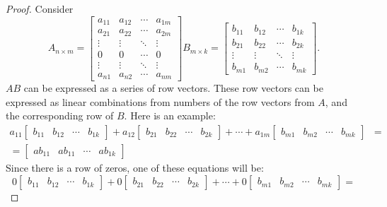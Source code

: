 \documentclass{article}
\begin{document}
\begin{enumerate}
{\begin{enumerate}
\begin{proof}
        Consider
        \[
          A_{n \times m} = \begin{bmatrix}
            a_{11} & a_{12} & \cdots & a_{1m} \\
            a_{21} & a_{22} & \cdots & a_{2m} \\
            \vdots & \vdots & \ddots & \vdots \\
            0      & 0      & \cdots & 0      \\
            \vdots & \vdots & \ddots & \vdots \\
            a_{n1} & a_{n2} & \cdots & a_{nm}
          \end{bmatrix}
          B_{m \times k} = \begin{bmatrix}
            b_{11} & b_{12} & \cdots & b_{1k} \\
            b_{21} & b_{22} & \cdots & b_{2k} \\
            \vdots & \vdots & \ddots & \vdots \\
            b_{m1} & b_{m2} & \cdots & b_{mk}
          \end{bmatrix}.
        \]
        $AB$ can be expressed as a series of row vectors. These row vectors can be expressed as linear combinations from numbers of the row vectors from $A$, and the corresponding row of $B$. Here is an example:
        \begin{align}
          a_{11}\begin{bmatrix} b_{11} & b_{12} & \cdots & b_{1k}\end{bmatrix} +
          a_{12}\begin{bmatrix} b_{21} & b_{22} & \cdots & b_{2k}\end{bmatrix} + \cdots +
          a_{1m}\begin{bmatrix} b_{m1} & b_{m2} & \cdots & b_{mk}\end{bmatrix} & = \\
          = \begin{bmatrix}ab_{11} & ab_{11} & \cdots & ab_{1k} \end{bmatrix}  &
        \end{align}
        Since there is a row of zeros, one of these equations will be:
        \[
          0\begin{bmatrix} b_{11} & b_{12} & \cdots & b_{1k}\end{bmatrix} +
          0\begin{bmatrix} b_{21} & b_{22} & \cdots & b_{2k}\end{bmatrix} + \cdots +
          0\begin{bmatrix} b_{m1} & b_{m2} & \cdots & b_{mk}\end{bmatrix} =
\]
\end{proof}
\end{enumerate}}
\end{enumerate}
\end{document}
